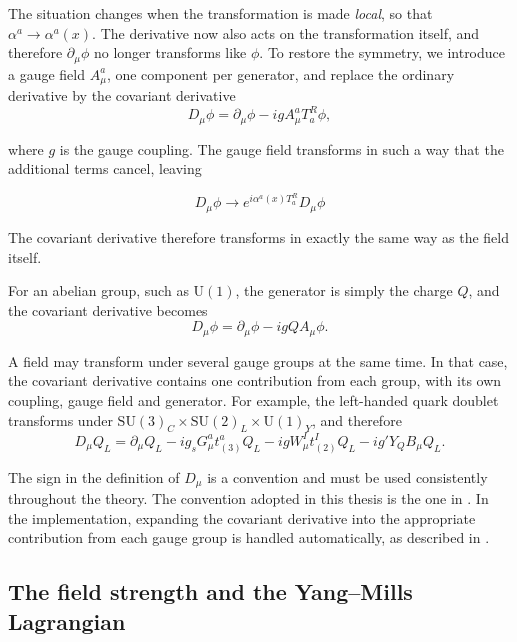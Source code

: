 The situation changes when the transformation is made \emph{local}, so that
$\alpha^a\to\alpha^a(x)$. The derivative now also acts on the transformation
itself, and therefore $\partial_\mu\phi$ no longer transforms like $\phi$.
To restore the symmetry, we introduce a gauge field $A_\mu^a$, one component
per generator, and replace the ordinary derivative by the covariant
derivative
\begin{equation}
D_\mu\phi = \partial_\mu\phi -igA_\mu^aT_a^R\phi ,
\label{eq:theory-covd}
\end{equation}

where $g$ is the gauge coupling. The gauge field transforms in such a way
that the additional terms cancel, leaving

\begin{equation}
    D_\mu\phi
    \longrightarrow
    e^{i\alpha^a(x)T_a^R}D_\mu\phi
\end{equation}

The covariant derivative therefore transforms in exactly the same way as the
field itself.

For an abelian group, such as $\mathrm{U}(1)$, the generator is simply the
charge $Q$, and the covariant derivative becomes
\begin{equation}
D_\mu\phi
=
\partial_\mu\phi
-igQA_\mu\phi .
\end{equation}

A field may transform under several gauge groups at the same time. In that
case, the covariant derivative contains one contribution from each group,
with its own coupling, gauge field and generator. For example, the
left-handed quark doublet transforms under
$\mathrm{SU}(3)_C\times\mathrm{SU}(2)_L\times\mathrm{U}(1)_Y$, and therefore
\begin{equation}
    D_\mu Q_L = \partial_\mu Q_L
    -ig_sG_\mu^a t^a_{(3)}Q_L
    -igW_\mu^I t^I_{(2)}Q_L
    -ig'Y_QB_\mu Q_L .
\label{eq:theory-covd-sm}
\end{equation}

The sign in the definition of $D_\mu$ is a convention and must be used
consistently throughout the theory. The convention adopted in this thesis is
the one in . In the implementation, expanding the
covariant derivative into the appropriate contribution from each gauge group
is handled automatically, as described in
.

\subsection{The field strength and the Yang--Mills Lagrangian}
\label{sec:theory-fieldstrength}

